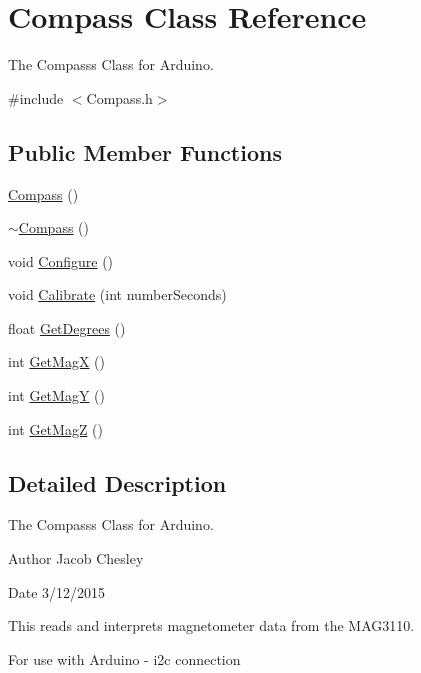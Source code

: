 \hypertarget{class_compass}{}\section{Compass Class Reference}
\label{class_compass}


The Compasss Class for Arduino.  




{\ttfamily \#include $<$Compass.\+h$>$}

\subsection*{Public Member Functions}
\begin{DoxyCompactItemize}
\item 
\hyperlink{class_compass_a68bd2a073cc0d461b2b46529aae04765}{Compass} ()
\item 
\hyperlink{class_compass_a26c27c9b7bba5b3107f1c671bd6f31c9}{$\sim$\+Compass} ()
\item 
void \hyperlink{class_compass_ad8b63895153ca9a59f1f37185b15ab6f}{Configure} ()
\item 
void \hyperlink{class_compass_a66509cf83a7ad1bceb0ce4a722d4625e}{Calibrate} (int number\+Seconds)
\item 
float \hyperlink{class_compass_a0f40d552d93cdd68f52dcc91729e8c1a}{Get\+Degrees} ()
\item 
int \hyperlink{class_compass_a02f7e01713ebeba382918ea8919a9374}{Get\+Mag\+X} ()
\item 
int \hyperlink{class_compass_a2041f9595b86000723d1c6457c0fa7eb}{Get\+Mag\+Y} ()
\item 
int \hyperlink{class_compass_aa624c8fd7add475a651bad1d0339c0ee}{Get\+Mag\+Z} ()
\end{DoxyCompactItemize}


\subsection{Detailed Description}
The Compasss Class for Arduino. 

\begin{DoxyAuthor}{Author}
Jacob Chesley 
\end{DoxyAuthor}
\begin{DoxyDate}{Date}
3/12/2015
\end{DoxyDate}
This reads and interprets magnetometer data from the M\+A\+G3110.

For use with Arduino -\/ i2c connection 

